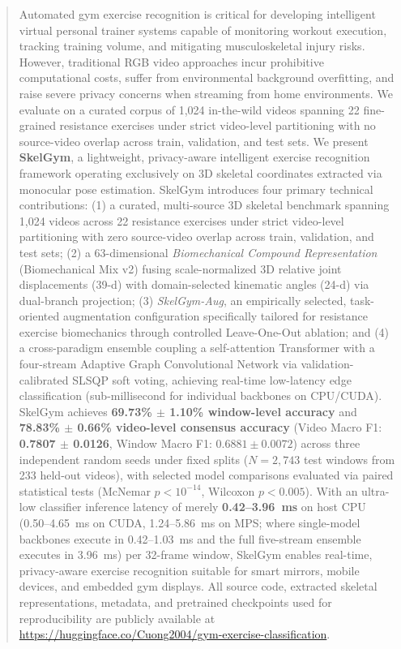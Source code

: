 \documentclass[runningheads]{llncs}
\begin{document}
\begin{abstract}
Automated gym exercise recognition is critical for developing intelligent virtual personal trainer systems capable of monitoring workout execution, tracking training volume, and mitigating musculoskeletal injury risks. However, traditional RGB video approaches incur prohibitive computational costs, suffer from environmental background overfitting, and raise severe privacy concerns when streaming from home environments. We evaluate on a curated corpus of 1,024 in-the-wild videos spanning 22 fine-grained resistance exercises under strict video-level partitioning with no source-video overlap across train, validation, and test sets. We present \textbf{SkelGym}, a lightweight, privacy-aware intelligent exercise recognition framework operating exclusively on 3D skeletal coordinates extracted via monocular pose estimation. SkelGym introduces four primary technical contributions: (1) a curated, multi-source 3D skeletal benchmark spanning 1,024 videos across 22 resistance exercises under strict video-level partitioning with zero source-video overlap across train, validation, and test sets; (2) a 63-dimensional \textit{Biomechanical Compound Representation} (Biomechanical Mix v2) fusing scale-normalized 3D relative joint displacements (39-d) with domain-selected kinematic angles (24-d) via dual-branch projection; (3) \textit{SkelGym-Aug}, an empirically selected, task-oriented augmentation configuration specifically tailored for resistance exercise biomechanics through controlled Leave-One-Out ablation; and (4) a cross-paradigm ensemble coupling a self-attention Transformer with a four-stream Adaptive Graph Convolutional Network via validation-calibrated SLSQP soft voting, achieving real-time low-latency edge classification (sub-millisecond for individual backbones on CPU/CUDA). SkelGym achieves \textbf{69.73\% $\pm$ 1.10\% window-level accuracy} and \textbf{78.83\% $\pm$ 0.66\% video-level consensus accuracy} (Video Macro F1: \textbf{0.7807 $\pm$ 0.0126}, Window Macro F1: $0.6881 \pm 0.0072$) across three independent random seeds under fixed splits ($N=2,743$ test windows from 233 held-out videos), with selected model comparisons evaluated via paired statistical tests (McNemar $p < 10^{-14}$, Wilcoxon $p < 0.005$). With an ultra-low classifier inference latency of merely \textbf{0.42--3.96~ms} on host CPU (0.50--4.65~ms on CUDA, 1.24--5.86~ms on MPS; where single-model backbones execute in 0.42--1.03~ms and the full five-stream ensemble executes in 3.96~ms) per 32-frame window, SkelGym enables real-time, privacy-aware exercise recognition suitable for smart mirrors, mobile devices, and embedded gym displays. All source code, extracted skeletal representations, metadata, and pretrained checkpoints used for reproducibility are publicly available at \url{https://huggingface.co/Cuong2004/gym-exercise-classification}.

\end{abstract}
\end{document}
